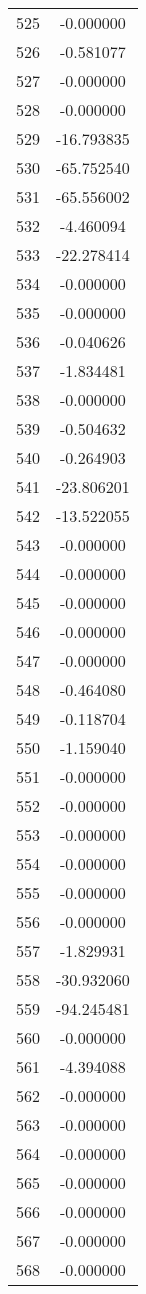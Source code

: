 \documentclass[12pt]{article}
\begin{document}
\begin{longtable}{@{}cc@{}}
525 & -0.000000 \\
526 & -0.581077 \\
527 & -0.000000 \\
528 & -0.000000 \\
529 & -16.793835 \\
530 & -65.752540 \\
531 & -65.556002 \\
532 & -4.460094 \\
533 & -22.278414 \\
534 & -0.000000 \\
535 & -0.000000 \\
536 & -0.040626 \\
537 & -1.834481 \\
538 & -0.000000 \\
539 & -0.504632 \\
540 & -0.264903 \\
541 & -23.806201 \\
542 & -13.522055 \\
543 & -0.000000 \\
544 & -0.000000 \\
545 & -0.000000 \\
546 & -0.000000 \\
547 & -0.000000 \\
548 & -0.464080 \\
549 & -0.118704 \\
550 & -1.159040 \\
551 & -0.000000 \\
552 & -0.000000 \\
553 & -0.000000 \\
554 & -0.000000 \\
555 & -0.000000 \\
556 & -0.000000 \\
557 & -1.829931 \\
558 & -30.932060 \\
559 & -94.245481 \\
560 & -0.000000 \\
561 & -4.394088 \\
562 & -0.000000 \\
563 & -0.000000 \\
564 & -0.000000 \\
565 & -0.000000 \\
566 & -0.000000 \\
567 & -0.000000 \\
568 & -0.000000 \\

\end{longtable}
\end{document}

